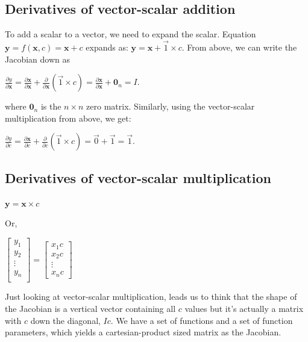 \documentclass[11pt]{article}
\begin{document}
\subsection{Derivatives of vector-scalar addition}

To add a scalar to a vector, we need to expand the scalar.  Equation $\mathbf{y} = f(\mathbf{x},c) = \mathbf{x} + c$ expands as: $\mathbf{y} = \mathbf{x} + \vec{1} \times c$.  From above, we can write the Jacobian down as

$
\frac{\partial y}{\partial {\mathbf{x}}} = \frac{\partial \mathbf{x}}{\partial \mathbf{x}} + \frac{\partial}{\partial \mathbf{x}}(\vec{1}\times c) =  \frac{\partial \mathbf{x}}{\partial \mathbf{x}} + \mathbf{0}_n = I.
$

where $\mathbf{0}_{n}$ is the $n \times n$ zero matrix. Similarly, using the vector-scalar multiplication from above, we get:

$\frac{\partial y}{\partial c} = \frac{\partial \mathbf{x}}{\partial c} + \frac{\partial}{\partial c} (\vec{1} \times c) = \vec{0} + \vec{1} = \vec{1}$.

\subsection{Derivatives of vector-scalar multiplication}

$\mathbf{y} = \mathbf{x} \times c$

Or,

$\begin{bmatrix}
           y_1\\
           y_2\\
           \vdots \\
           y_n\\
           \end{bmatrix} = \begin{bmatrix}
		   
           x_{1} c\\
           x_{2} c\\
           \vdots \\
           x_{n} c
         \end{bmatrix}$

Just looking at vector-scalar multiplication, leads us to think that the shape of the Jacobian is a vertical vector containing all $c$ values but it's actually a matrix with $c$ down the diagonal, $I c$. We have a set of functions and a set of function parameters, which yields a cartesian-product sized matrix as the Jacobian.
\end{document}

